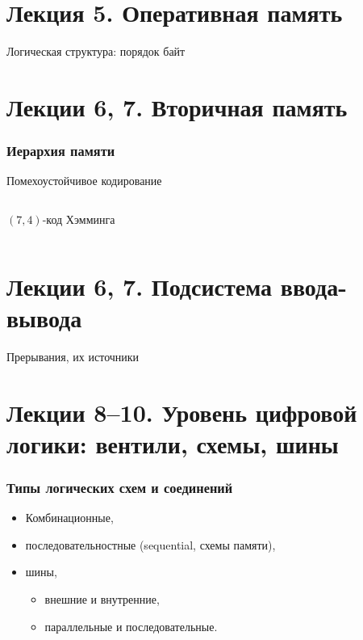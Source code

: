 \section{Лекция 5. Оперативная память}
\begin{frame}{Логическая структура: порядок байт}
\end{frame}

\section[Вторичная память]{Лекции 6, 7.  Вторичная память}

\begin{frame}
\frametitle{Иерархия памяти}
\end{frame}

\begin{frame}{Помехоустойчивое кодирование}
\begin{columns}
    \column{7cm}
\begin{block}{$(7, 4)$-код Хэмминга}
\end{block}
    \column{0cm}
\end{columns}
\end{frame}

\section[Подсистема ввода-вывода]{Лекции 6, 7.  Подсистема ввода-вывода}
\begin{frame}{Прерывания, их источники}
\end{frame}

\section[Вентили и основные логические схемы]{Лекции 8–10.  Уровень цифровой логики: вентили, схемы, шины}
\begin{frame}
\frametitle{Типы логических схем и соединений}
\begin{itemize}
    \item Комбинационные,
    \item последовательностные (sequential, схемы памяти),
    \item шины,
    \begin{itemize}
        \item внешние и внутренние,
        \item параллельные и последовательные.
    \end{itemize}
\end{itemize}
\end{frame}

